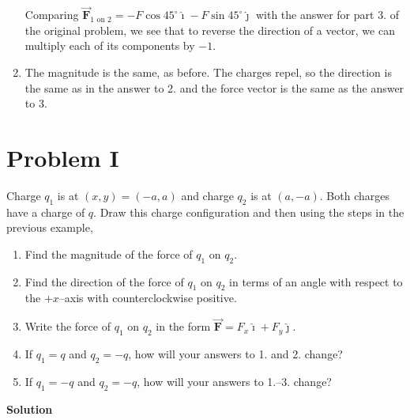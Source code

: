 \documentclass{article}
\renewcommand{\mbox}{\text}
\newcommand{\ihat}[0]{\hat{\boldsymbol{\imath}}}
\newcommand{\jhat}[0]{\hat{\boldsymbol{\jmath}}}
\newcommand{\bfvec}[1]{\vec{\mathbf{#1}}}
\begin{document}
\begin{enumerate}
        Comparing $\bfvec{F}_{1\mbox{ on } 2} = -F\cos 45^\circ \ihat - F\sin 45^\circ \jhat$ with the answer for part 3. of the original problem, we see that to reverse the direction of a vector, we can multiply each of its components by $-1$.

        

  \item The magnitude is the same, as before. The charges repel, so the direction is the same as in the answer to 2. and the force vector is the same as the answer to 3.

        \ifsolutions
        \newpage
        \fi

\end{enumerate}

\section{Problem I}

Charge $q_1$ is at $(x,y)=(-a,a)$ and charge $q_2$ is at $(a, -a)$. Both charges have a charge of $q$. Draw this charge configuration and then using the steps in the previous example,

\begin{enumerate}

  \item Find the magnitude of the force of $q_1$ on $q_2$.

  \item Find the direction of the force of $q_1$ on $q_2$ in terms of an angle with respect to the $+x$--axis with counterclockwise positive.

  \item Write the force of $q_1$ on $q_2$ in the form $\bfvec{F}=F_x\ihat + F_y\jhat$.

  \item If $q_1=q$ and $q_2=-q$, how will your answers to 1. and 2. change?

  \item If $q_1=-q$ and $q_2=-q$, how will your answers to 1.--3. change?

\end{enumerate}

\ifsolutions
{\bf Solution}
\end{document}
